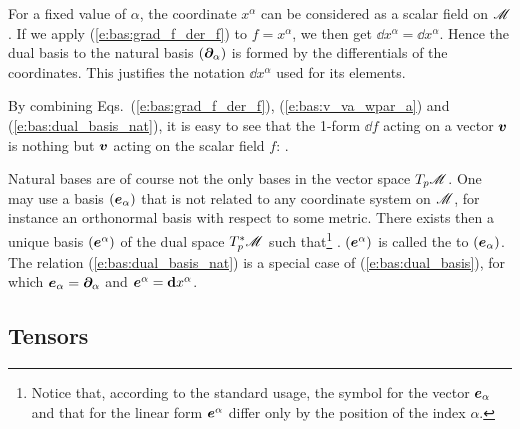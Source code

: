 \begin{remark}
For a fixed value of $\alpha$, the coordinate $x^\alpha$ can be considered as a scalar field on $\mathscr{M}$.
If we apply (\ref{e:bas:grad_f_der_f}) to $f=x^\alpha$, we then get $\dd x^\alpha = \dd x^\alpha$.
Hence the dual basis to the natural basis $(\bm{\partial}_\alpha)$ is formed by the
differentials of the coordinates. This justifies the notation $\dd x^\alpha$ used for its elements.
\end{remark}

By combining Eqs.~(\ref{e:bas:grad_f_der_f}), (\ref{e:bas:v_va_wpar_a}) and (\ref{e:bas:dual_basis_nat}), it is
easy to see that the 1-form $\dd f$ acting on a vector $\bm{v}$ is nothing but $\bm{v}$ acting on the scalar field
$f$:
\be \label{e:bas:df_v_eq_v_f}
    .
\ee

Natural bases are of course not the only bases in the vector
space $T_p\mathscr{M}$. One may use a basis $(\bm{e}_\alpha)$ that is not related to any coordinate system on $\mathscr{M}$, for instance an orthonormal basis with respect to some metric.
There exists then a unique basis $(\bm{e}^\alpha)$
of the dual space ${T_p^*\mathscr{M}}$ such that\footnote{Notice that,
according to the standard usage, the symbol for the vector $\bm{e}_\alpha$ and that for the linear form $\bm{e}^\alpha$ differ only by the position of the index $\alpha$.}
\be \label{e:bas:dual_basis}
   .
\ee
$(\bm{e}^\alpha)$ is called the  to
$(\bm{e}_\alpha)$.
The relation (\ref{e:bas:dual_basis_nat}) is a special case
of (\ref{e:bas:dual_basis}), for which $\bm{e}_\alpha = \bm{\partial}_\alpha$ and $\bm{e}^\alpha = \mathbf{d} x^\alpha$.


\subsection{Tensors} \label{s:bas:tensors}

